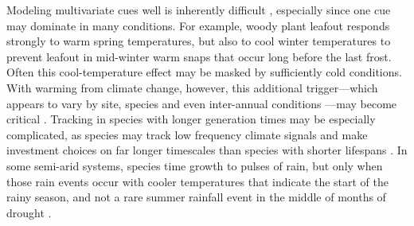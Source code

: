 \documentclass[11pt,letterpaper]{article}
\begin{document}
Modeling multivariate cues well is inherently difficult \citep{chuine2016}, especially since one cue may dominate in many conditions. For example, woody plant leafout responds strongly to warm spring temperatures, but also to cool winter temperatures to prevent leafout in mid-winter warm snaps that occur long before the last frost. Often this cool-temperature effect may be masked by sufficiently cold conditions. With warming from climate change, however, this additional trigger---which appears to vary by site, species and even inter-annual conditions \citep{dennis2003}---may become critical \citep[and potentially lead many phenological models to fail spectacularly in the future as additional cues come into play, see][]{chuine2016}. Tracking in species with longer generation times may be especially complicated, as species may track low frequency climate signals and make investment choices on far longer timescales than species with shorter lifespans \citep{morris2008}. In some semi-arid systems, species time growth to pulses of rain, but only when those rain events occur with cooler temperatures that indicate the start of the rainy season, and not a rare summer rainfall event in the middle of months of drought \citep{Wainwright:2012tw,wainwright2013}. 
\end{document}
